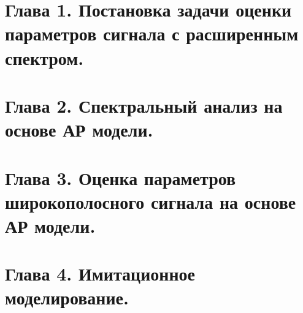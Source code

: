 

%

\tableofcontents %
\newpage





\section{Глава 1. Постановка задачи оценки параметров сигнала с расширенным спектром.}
\label{sec1_acq_algo}






\section{Глава 2. Спектральный анализ на основе АР модели.}






\section{Глава 3. Оценка параметров широкополосного сигнала на основе АР модели.}





\section{Глава 4. Имитационное моделирование.}






